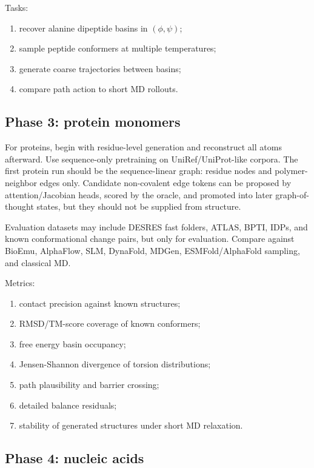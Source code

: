 \documentclass[11pt]{article}
\begin{document}
Tasks:
\begin{enumerate}[leftmargin=2em]
  \item recover alanine dipeptide basins in $(\phi,\psi)$;
  \item sample peptide conformers at multiple temperatures;
  \item generate coarse trajectories between basins;
  \item compare path action to short MD rollouts.
\end{enumerate}

\subsection{Phase 3: protein monomers}

For proteins, begin with residue-level generation and reconstruct all atoms afterward. Use sequence-only pretraining on UniRef/UniProt-like corpora. The first protein run should be the sequence-linear graph: residue nodes and polymer-neighbor edges only. Candidate non-covalent edge tokens can be proposed by attention/Jacobian heads, scored by the oracle, and promoted into later graph-of-thought states, but they should not be supplied from structure.

Evaluation datasets may include DESRES fast folders, ATLAS, BPTI, IDPs, and known conformational change pairs, but only for evaluation. Compare against BioEmu, AlphaFlow, SLM, DynaFold, MDGen, ESMFold/AlphaFold sampling, and classical MD.

Metrics:
\begin{enumerate}[leftmargin=2em]
  \item contact precision against known structures;
  \item RMSD/TM-score coverage of known conformers;
  \item free energy basin occupancy;
  \item Jensen-Shannon divergence of torsion distributions;
  \item path plausibility and barrier crossing;
  \item detailed balance residuals;
  \item stability of generated structures under short MD relaxation.
\end{enumerate}

\subsection{Phase 4: nucleic acids}
\end{document}
